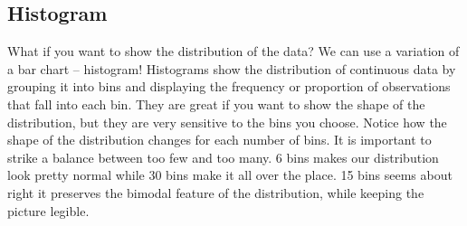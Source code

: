 \documentclass[
  letterpaper,
]{book}
\begin{document}
\hypertarget{histogram}{%
\subsection{Histogram}\label{histogram}}

What if you want to show the distribution of the data? We can use a
variation of a bar chart -- histogram! Histograms show the distribution
of continuous data by grouping it into bins and displaying the frequency
or proportion of observations that fall into each bin. They are great if
you want to show the shape of the distribution, but they are very
sensitive to the bins you choose. Notice how the shape of the
distribution changes for each number of bins. It is important to strike
a balance between too few and too many. 6 bins makes our distribution
look pretty normal while 30 bins make it all over the place. 15 bins
seems about right it preserves the bimodal feature of the distribution,
while keeping the picture legible.
\end{document}
